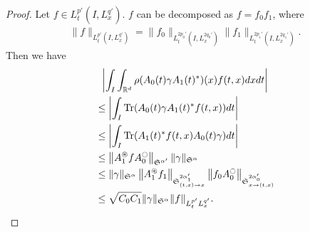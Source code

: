 \documentclass[10pt,a4paper]{amsart}
\providecommand{\No}[1]{\left\| #1 \right\|}
\newcommand{\oast}{\circledast}
\newcommand{\FS}{\mathfrak{S}}
\newcommand{\al}{\alpha}
\newcommand{\ga}{\gamma}
\newcommand{\rh}{\rho}
\newcommand{\abs}[1]{\left|#1\right|}
\renewcommand{\No}[1]{\left\| #1 \right\|}
\DeclareMathOperator{\Tr}{Tr}
\newcommand{\Sa}{{\FS^\al}}
\newcommand{\R}{\mathbb{R}}
\newcommand{\oc}{\ocircle}
\newcommand{\os}{\oast}
\begin{document}
\begin{proof}
Let $f \in L^{p'}_t(I,L^{q'}_x)$. $f$ can be decomposed as $f = f_0 f_1$, where
\begin{align}
\|f\|_{L^{p'}_t\left(I,L^{q'}_x\right)} = \|f_0\|_{L^{2p_0'}_t\left(I,L^{2q_0'}_x\right)} \|f_1\|_{L^{2p_1'}_t\left(I,L^{2q_1'}_x\right)}.
\end{align}
Then we have
\begin{multline}
\abs{\int_I \int_{\R^d} \rh(A_0(t)\ga A_1(t)^*)(x) f(t,x) dx dt}\\
\begin{aligned}
 &\leq \abs{\int_I \Tr (A_0(t) \ga A_1(t)^* f(t,x)) dt } \\
&\leq \abs{\int_I \Tr (A_1(t)^* f(t,x)A_0(t) \ga) dt} \\
&\leq \No{A_1^\os f A_0^\oc }_{\FS^{\al'}} \|\ga\|_{\FS^\al} \\
&\leq \|\ga\|_{\Sa} \left\|A_1^\os f_1\right\|_{\FS^{2\al_1'}_{(t,x) \to x}} \left\|f_0 A_0^\oc\right\|_{\FS^{2\al_0'}_{x\to(t,x)}}\\
&\leq \sqrt{C_0C_1}\|\ga\|_\Sa \|f\|_{L^{p'}_tL^{q'}_x}.\qedhere
\end{aligned}
\end{multline}
\end{proof}
\end{document}
